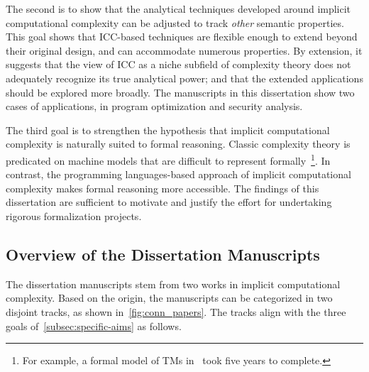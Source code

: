 The second is to show that the analytical techniques developed around implicit computational complexity can be adjusted to track \emph{other} semantic properties.
This goal shows that ICC-based techniques are flexible enough to extend beyond their original design, and can accommodate numerous properties.
By extension, it suggests that the view of ICC as a niche subfield of complexity theory does not adequately recognize its true analytical power;
and that the extended applications should be explored more broadly.
The manuscripts in this dissertation show two cases of applications, in program optimization and security analysis.
 
The third goal is to strengthen the hypothesis that implicit computational complexity is naturally suited to formal reasoning.
Classic complexity theory is predicated on machine models that are difficult to represent formally~\footnote{
For example, a formal model of TMs in~\textcite{forster2020} took five years to complete.}.
In contrast, the programming languages-based approach of implicit computational complexity makes formal reasoning more accessible.
The findings of this dissertation are sufficient to motivate and justify the effort for undertaking rigorous formalization projects.


\subsection{Overview of the Dissertation Manuscripts}
\label{subsec:conn-papers}

The dissertation manuscripts stem from two works in implicit computational complexity.
Based on the origin, the manuscripts can be categorized in two disjoint tracks, as shown in~\autoref{fig:conn_papers}.
The tracks align with the three goals of~\autoref{subsec:specific-aims} as follows.

